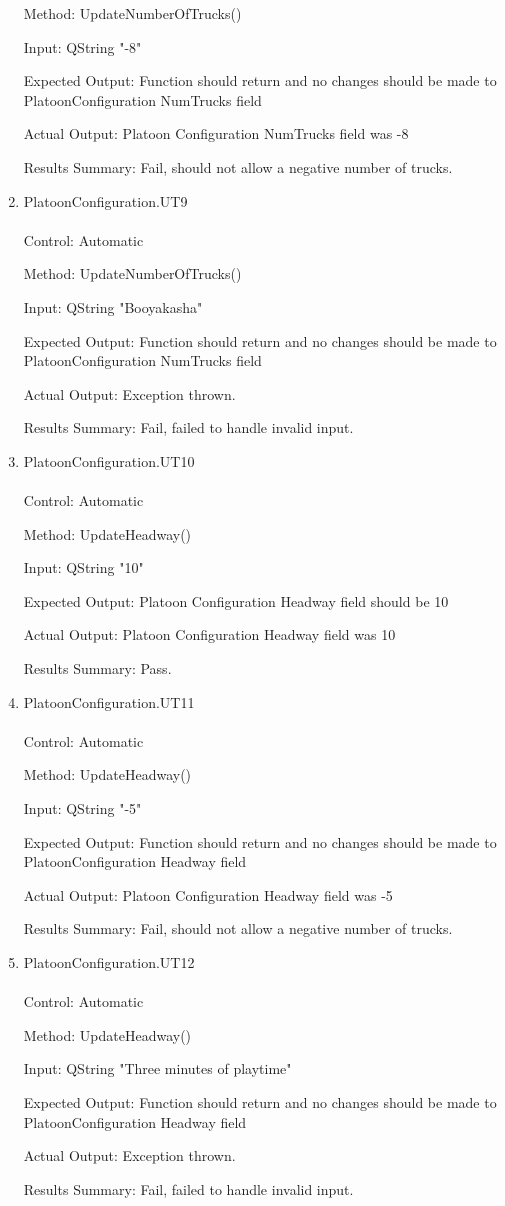 \documentclass[12pt, titlepage]{article}
\begin{document}
\begin{enumerate}
  Method: UpdateNumberOfTrucks()

  Input: QString "-8"

  Expected Output: Function should return and no changes should be made to PlatoonConfiguration NumTrucks field

  Actual Output: Platoon Configuration NumTrucks field was -8

  Results Summary: Fail, should not allow a negative number of trucks.
  \item{PlatoonConfiguration.UT9}\\\\
  Control: Automatic

  Method: UpdateNumberOfTrucks()

  Input: QString "Booyakasha"

  Expected Output: Function should return and no changes should be made to PlatoonConfiguration NumTrucks field

  Actual Output: Exception thrown.

  Results Summary: Fail, failed to handle invalid input.
  \item{PlatoonConfiguration.UT10}\\\\
  Control: Automatic

  Method: UpdateHeadway()

  Input: QString "10"

  Expected Output: Platoon Configuration Headway field should be 10

  Actual Output: Platoon Configuration Headway field was 10

  Results Summary: Pass.
\item{PlatoonConfiguration.UT11}\\\\
  Control: Automatic

  Method: UpdateHeadway()

  Input: QString "-5"

  Expected Output: Function should return and no changes should be made to PlatoonConfiguration Headway field

  Actual Output: Platoon Configuration Headway field was -5

  Results Summary: Fail, should not allow a negative number of trucks.
  \item{PlatoonConfiguration.UT12}\\\\
  Control: Automatic

  Method: UpdateHeadway()

  Input: QString "Three minutes of playtime"

  Expected Output: Function should return and no changes should be made to PlatoonConfiguration Headway field

  Actual Output: Exception thrown.

  Results Summary: Fail, failed to handle invalid input.
\end{enumerate}
\end{document}
